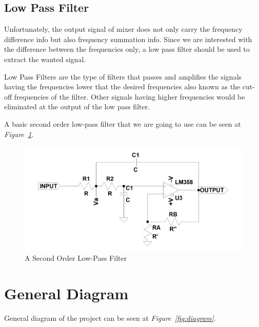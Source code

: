 \documentclass[paper]{IEEEtran}
\begin{document}
\vfill
		
\subsection{Low Pass Filter}


	Unfortunately, the output signal of mixer does not only carry the frequency difference info but also frequency summation info. Since we are interested with the difference between the frequencies only, a low pass filter should be used to extract the wanted signal.
	
	Low Pass Filters are the type of filters that passes and amplifies the signals having the frequencies lower that the desired frequencies also known as the cut-off frequencies of the filter. Other signals having higher frequencies would be eliminated at the output of the low pass filter. 	

	A basic second order low-pass filter that we are going to use can be seen at \textit{Figure~\ref{fig:lpf}}.

\begin{figure}[h!]
	\setlength{\unitlength}{\textwidth}
	\center 
	\includegraphics[width=0.5\unitlength]{solpf.png}
	\caption{\label{fig:lpf}A Second Order Low-Pass Filter }
\end{figure} 
	

		
\section{General Diagram}

	General diagram of the project can be seen at \textit{Figure~\ref{fig:diagram}}.
\end{document}
